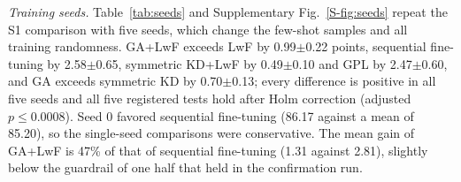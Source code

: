 \documentclass[journal]{IEEEtran}
\begin{document}
\textit{Training seeds.}\label{sec:seeds} Table~\ref{tab:seeds} and Supplementary Fig.~\ref{S-fig:seeds} repeat the S1 comparison with five seeds, which change the few-shot samples and all training randomness. GA+LwF exceeds LwF by 0.99$\pm$0.22 points, sequential fine-tuning by 2.58$\pm$0.65, symmetric KD+LwF by 0.49$\pm$0.10 and GPL by 2.47$\pm$0.60, and GA exceeds symmetric KD by 0.70$\pm$0.13; every difference is positive in all five seeds and all five registered tests hold after Holm correction (adjusted $p\le0.0008$). Seed 0 favored sequential fine-tuning (86.17 against a mean of 85.20), so the single-seed comparisons were conservative. The mean gain of GA+LwF is 47\% of that of sequential fine-tuning (1.31 against 2.81), slightly below the guardrail of one half that held in the confirmation run.

\begin{table}[t]
\caption{Five training seeds on stream S1 (mean and standard deviation; test splits with 8 frames per video). The never-updated detector does not depend on the seed.}
\label{tab:seeds}
\centering
\footnotesize
\setlength{\tabcolsep}{2.5pt}
\end{table}
\end{document}
